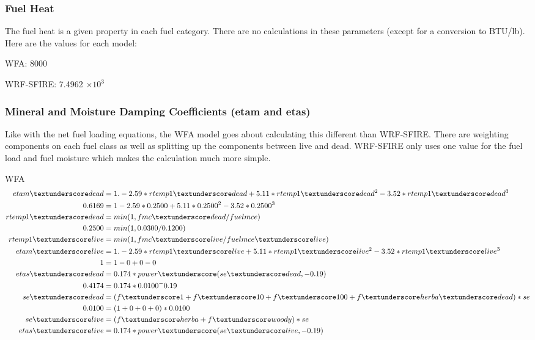 \documentclass{article}
\newcommand\tenpow[1]{\ensuremath{{\times}10^{#1}}}
\newcommand\und{\textunderscore}
\begin{document}
\subsubsection*{Fuel Heat}

The fuel heat is a given property in each fuel category. There are no calculations in these parameters (except for a conversion to BTU/lb). Here are the values for each model:

WFA: 8000

WRF-SFIRE: 7.4962 \tenpow{3}


\subsubsection*{Mineral and Moisture Damping Coefficients (etam and etas)}
Like with the net fuel loading equations, the WFA model goes about calculating this different than WRF-SFIRE. There are weighting components on each fuel class as well as splitting up the components between live and dead. WRF-SFIRE only uses one value for the fuel load and fuel moisture which makes the calculation much more simple.

WFA
\begin{equation}
\label{mineral_damping_WFA}
\begin{split}
		etam\und dead &= 1. - 2.59*rtemp1\und dead + 5.11*rtemp1\und dead^2 - 3.52*rtemp1\und dead^3 \\
		0.6169 &= 1 - 2.59 * 0.2500 + 5.11 * 0.2500 ^ 2 - 3.52 * 0.2500 ^ 3 \\
		rtemp1\und dead &= min(1,fmc\und dead/fuelmce) \\
		0.2500 &= min(1, 0.0300 / 0.1200) \\
		rtemp1\und live   &= min(1,fmc\und live/fuelmce\und live) \\
		etam\und live &= 1. - 2.59*rtemp1\und live + 5.11*rtemp1\und live^2 - 3.52*rtemp1\und live^3 \\
		1 &= 1 - 0 + 0 - 0 \\
		etas\und dead &= 0.174* power\und (se\und dead, -0.19) \\
		0.4174 &= 0.174 * 0.0100^-0.19 \\
		se\und dead &= (f\und 1 + f\und 10 + f\und 100 + f\und herba\und dead) * se \\
		0.0100 &= (1 + 0 + 0 + 0) * 0.0100 \\
		se\und live &= (f\und herba + f\und woody) * se \\
		etas\und live &= 0.174* power\und (se\und live, -0.19) 
\end{split}
\end{equation}
\end{document}
